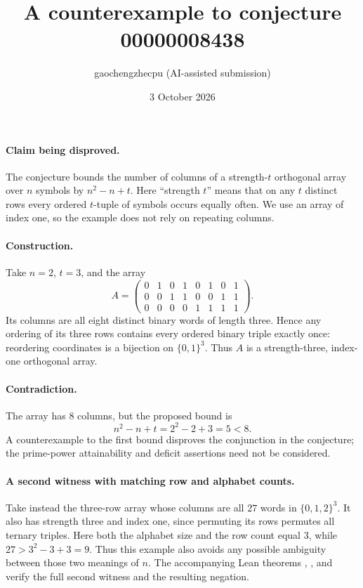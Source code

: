 \documentclass[10pt]{article}
\title{A counterexample to conjecture 00000008438}
\author{gaochengzhecpu (AI-assisted submission)}
\date{3 October 2026}
\makeatletter
\renewcommand{\maketitle}{\begin{center}
{\Large\bfseries\@title\par}\vspace{0.6em}
{\small\@author\par\@date}
\end{center}\vspace{0.5em}}
\makeatother
\begin{document}
\maketitle
\paragraph{Claim being disproved.}
The conjecture bounds the number of columns of a strength-$t$ orthogonal array over $n$ symbols by $n^2-n+t$. Here ``strength $t$'' means that on any $t$ distinct rows every ordered $t$-tuple of symbols occurs equally often. We use an array of index one, so the example does not rely on repeating columns.
\paragraph{Construction.}
Take $n=2$, $t=3$, and the array
\[
 A=\begin{pmatrix}
 0&1&0&1&0&1&0&1\\
 0&0&1&1&0&0&1&1\\
 0&0&0&0&1&1&1&1
 \end{pmatrix}.
\]
Its columns are all eight distinct binary words of length three. Hence any ordering of its three rows contains every ordered binary triple exactly once: reordering coordinates is a bijection on $\{0,1\}^3$. Thus $A$ is a strength-three, index-one orthogonal array.
\paragraph{Contradiction.}
The array has $8$ columns, but the proposed bound is
\[
 n^2-n+t=2^2-2+3=5<8.
\]
A counterexample to the first bound disproves the conjunction in the conjecture; the prime-power attainability and deficit assertions need not be considered.
\paragraph{A second witness with matching row and alphabet counts.}
Take instead the three-row array whose columns are all $27$ words in $\{0,1,2\}^3$. It also has strength three and index one, since permuting its rows permutes all ternary triples. Here both the alphabet size and the row count equal $3$, while $27>3^2-3+3=9$. Thus this example also avoids any possible ambiguity between those two meanings of $n$. The accompanying Lean theorems , , and  verify the full second witness and the resulting negation.
\end{document}
